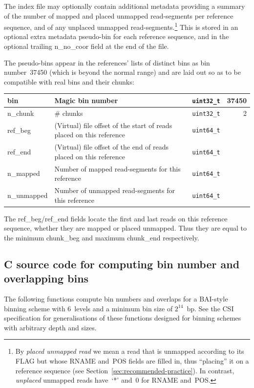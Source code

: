 \documentclass[10pt]{article}
\begin{document}
The index file may optionally contain additional metadata providing a summary
of the number of mapped and placed unmapped read-segments per reference sequence,
and of any unplaced unmapped read-segments.\footnote{By \emph{placed unmapped
read} we mean a read that is unmapped according to its {\sf FLAG} but whose
{\sf RNAME} and~{\sf POS} fields are filled in, thus ``placing'' it on a
reference sequence (see Section~\ref{sec:recommended-practice}).
In contrast, \emph{unplaced} unmapped reads have~`*' and~0 for {\sf RNAME}
and~{\sf POS}.}
This is stored in an optional extra metadata pseudo-bin for each reference
sequence, and in the optional trailing {\sf n\_no\_coor} field at the end of
the file.

The pseudo-bins appear in the references' lists of distinct bins as bin
number~37450 (which is beyond the normal range) and are laid out so as to be
compatible with real bins and their chunks:

\begin{table}[ht]
\centering\small
\begin{tabular}{|l|l|l|r|}
  \hline
  {\sf bin} & Magic bin number & {\tt uint32\_t} & 37450 \\\hline
  {\sf n\_chunk} & \# chunks & {\tt uint32\_t} & 2 \\\hline
  {\sf ref\_beg} & (Virtual) file offset of the start of reads placed on this reference& {\tt uint64\_t} & \\\hline
  {\sf ref\_end} & (Virtual) file offset of the end of reads placed on this reference& {\tt uint64\_t} & \\\hline
  {\sf n\_mapped} & Number of mapped read-segments for this reference & {\tt uint64\_t} & \\\hline
  {\sf n\_unmapped} & Number of unmapped read-segments for this reference & {\tt uint64\_t} & \\\hline
\end{tabular}
\end{table}

\noindent
The {\sf ref\_beg}/{\sf ref\_end} fields locate the first and last reads on this reference sequence, whether they are mapped or placed unmapped.
Thus they are equal to the minimum {\sf chunk\_beg} and maximum {\sf chunk\_end} respectively.

\subsection{C source code for computing bin number and overlapping bins}\label{sec:code}
The following functions compute bin numbers and overlaps for a BAI-style
binning scheme with $6$~levels and a minimum bin size of $2^{14}$~bp.
See the CSI specification for generalisations of these functions designed for
binning schemes with arbitrary depth and sizes.
\end{document}
